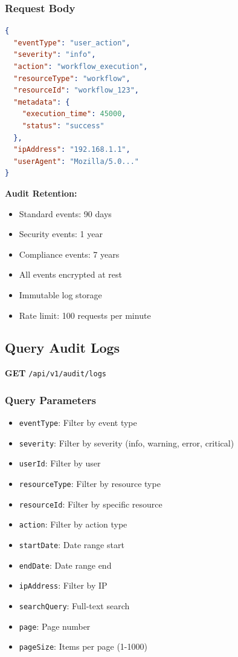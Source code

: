 \documentclass[11pt,a4paper]{report}
\begin{document}
\subsubsection{Request Body}
\begin{lstlisting}[style=jsoncode,language=json]
{
  "eventType": "user_action",
  "severity": "info",
  "action": "workflow_execution",
  "resourceType": "workflow",
  "resourceId": "workflow_123",
  "metadata": {
    "execution_time": 45000,
    "status": "success"
  },
  "ipAddress": "192.168.1.1",
  "userAgent": "Mozilla/5.0..."
}
\end{lstlisting}

\begin{infobox}
\textbf{Audit Retention:}
\begin{itemize}[leftmargin=*]
    \item Standard events: 90 days
    \item Security events: 1 year
    \item Compliance events: 7 years
    \item All events encrypted at rest
    \item Immutable log storage
    \item Rate limit: 100 requests per minute
\end{itemize}
\end{infobox}

\subsection{Query Audit Logs}

\textbf{GET} \texttt{/api/v1/audit/logs}

\subsubsection{Query Parameters}
\begin{itemize}[leftmargin=*]
    \item \texttt{eventType}: Filter by event type
    \item \texttt{severity}: Filter by severity (info, warning, error, critical)
    \item \texttt{userId}: Filter by user
    \item \texttt{resourceType}: Filter by resource type
    \item \texttt{resourceId}: Filter by specific resource
    \item \texttt{action}: Filter by action type
    \item \texttt{startDate}: Date range start
    \item \texttt{endDate}: Date range end
    \item \texttt{ipAddress}: Filter by IP
    \item \texttt{searchQuery}: Full-text search
    \item \texttt{page}: Page number
    \item \texttt{pageSize}: Items per page (1-1000)
\end{itemize}
\end{document}
